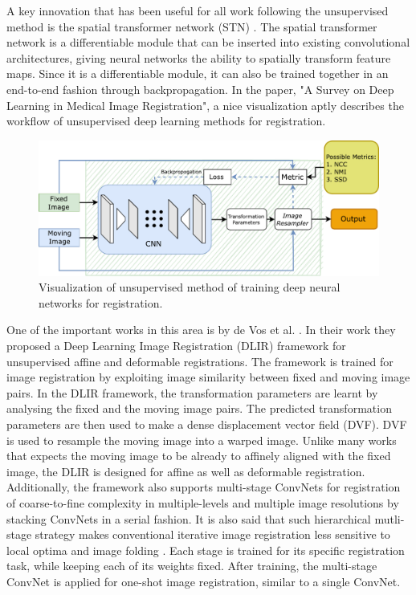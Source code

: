 \documentclass{book}
\begin{document}
	A key innovation that has been useful for all work following the unsupervised method is the spatial transformer network (STN) \cite{NIPS2015_33ceb07b}. The spatial transformer network is a differentiable module that can be inserted into existing convolutional architectures, giving neural networks the ability to spatially transform feature maps. Since it is a differentiable module, it can also be trained together in an end-to-end fashion through backpropagation. In the paper, "A Survey on Deep Learning in Medical Image Registration", \cite{Haskins_2020} a nice visualization aptly describes the workflow of unsupervised deep learning methods for registration.
	
	\begin{figure}[h!]
		\centering
		\includegraphics[width=0.9\columnwidth]{resources/chapter2/unsupervised_visualization.pdf}
		\caption{Visualization of unsupervised method of training deep neural networks for registration. \cite{Haskins_2020}}
		\label{fig:unsupervised_visualization}
	\end{figure}
	
	One of the important works in this area is by de Vos et al. \cite{de_Vos_2019}. In their work they proposed a Deep Learning Image Registration (DLIR) framework for unsupervised affine and deformable registrations. The framework is trained for image registration by exploiting image similarity between fixed and moving image pairs. In the DLIR framework, the transformation parameters are learnt by analysing the fixed and the moving image pairs. The predicted transformation parameters are then used to make a dense displacement vector field (DVF). DVF is used to resample the moving image into a warped image. Unlike many works that expects the moving image to be already to affinely aligned with the fixed image, the DLIR is designed for affine as well as deformable registration. Additionally, the framework also supports multi-stage ConvNets for registration of coarse-to-fine complexity in multiple-levels and multiple image resolutions by stacking ConvNets in a serial fashion. It is also said that such hierarchical mutli-stage strategy makes conventional iterative image registration less sensitive to local optima and image folding \cite{10.1007/3-540-45468-3_69}. Each stage is trained for its specific registration task, while keeping each of its weights fixed. After training, the multi-stage ConvNet is applied for one-shot image registration, similar to a single ConvNet.
	
\end{document}
